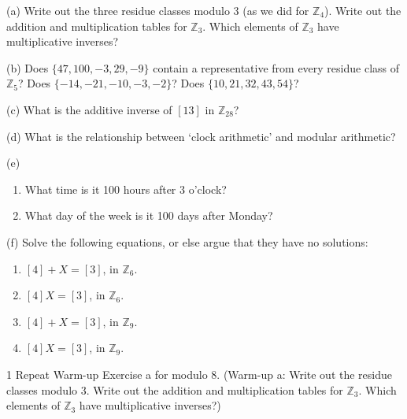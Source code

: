 \begin{problem}[Warmup]{(a)}
    Write out the three residue classes modulo 3 (as we did for $\mathbb{Z}_4$). Write out the addition and multiplication tables for $\mathbb{Z}_3$. Which elements of $\mathbb{Z}_3$ have multiplicative inverses?
\end{problem}
\unsolved

\begin{problem}[Warmup]{(b)}
    Does $\{47, 100, -3, 29, -9\}$ contain a representative from every residue class of $\mathbb{Z}_5$? Does $\{-14, -21, -10, -3, -2\}$? Does $\{10, 21, 32, 43, 54\}$?
\end{problem}
\unsolved

\begin{problem}[Warmup]{(c)}
    What is the additive inverse of $[13]$ in $\mathbb{Z}_{28}$?
\end{problem}
\unsolved

\begin{problem}[Warmup]{(d)}
    What is the relationship between `clock arithmetic' and modular arithmetic?
\end{problem}
\unsolved

\begin{problem}[Warmup]{(e)}
    \begin{enumerate}
        \item[(a)] What time is it 100 hours after 3 o'clock?
        \item[(b)] What day of the week is it 100 days after Monday?
    \end{enumerate}
\end{problem}
\unsolved

\begin{problem}[Warmup]{(f)}
    Solve the following equations, or else argue that they have no solutions:
    \begin{enumerate}
        \item[(a)] $[4] + X = [3]$, in $\mathbb{Z}_6$.
        \item[(b)] $[4]X = [3]$, in $\mathbb{Z}_6$.
        \item[(c)] $[4] + X = [3]$, in $\mathbb{Z}_9$.
        \item[(d)] $[4]X = [3]$, in $\mathbb{Z}_9$.
    \end{enumerate}
\end{problem}
\unsolved

\begin{problem}{1}
    Repeat Warm-up Exercise a for modulo 8. (Warm-up a: Write out the residue classes
    modulo 3. Write out the addition and multiplication tables for $\mathbb{Z}_3$.
    Which elements of $\mathbb{Z}_3$ have multiplicative inverses?)
\end{problem}
\unsolved

